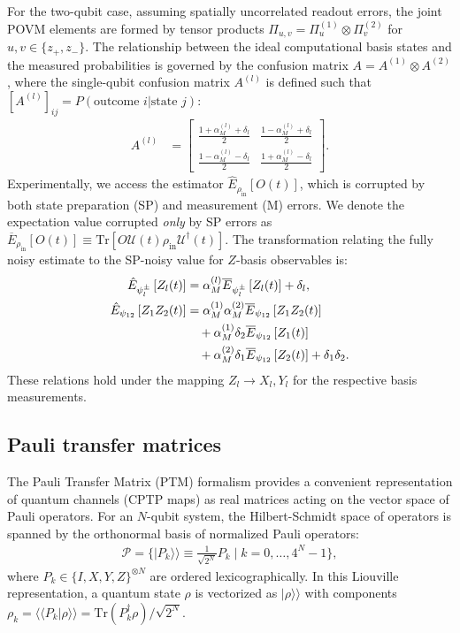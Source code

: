 \documentclass[%
 reprint,
superscriptaddress,
 amsmath,amssymb,
 aps,
pra,
floatfix,
]{revtex4-2}
\begin{document}
For the two-qubit case, assuming spatially uncorrelated readout errors, the joint POVM elements are formed by tensor products $\Pi_{u,v}=\Pi_u^{(1)}\otimes\Pi_v^{(2)}$ for $u,v\in\{z_+,z_-\}$. The relationship between the ideal computational basis states and the measured probabilities is governed by the confusion matrix $A = A^{(1)} \otimes A^{(2)}$, where the single-qubit confusion matrix $A^{(l)}$ is defined such that $[A^{(l)}]_{ij} = P(\text{outcome } i | \text{state } j)$:
\begin{align}
    A^{(l)}&=\begin{bmatrix}
        \frac{1+\alpha_M^{(l)}+\delta_l}{2} & \frac{1-\alpha_M^{(l)}+\delta_l}{2}\\
        \frac{1-\alpha_M^{(l)}-\delta_l}{2} & \frac{1+\alpha_M^{(l)}-\delta_l}{2}
    \end{bmatrix}.
\end{align}
Experimentally, we access the estimator $\hat{E}_{\rho_{\text{in}}}[O(t)]$, which is corrupted by both state preparation (SP) and measurement (M) errors. We denote the expectation value corrupted \textit{only} by SP errors as $\overline{E}_{\rho_{\text{in}}}[O(t)] \equiv \text{Tr}[O \mathcal{U}(t)\rho_{\text{in}}\mathcal{U}^\dagger(t)]$. The transformation relating the fully noisy estimate to the SP-noisy value for $Z$-basis observables is:
\begin{align}
    \hat{E}_{\psi^\pm_l}\left[Z_l(t)\right]&=\alpha^{(l)}_M\overline{E}_{\psi^\pm_l}\left[Z_l(t)\right]+\delta_l,\\
    \hat{E}_{\psi_{12}}\left[Z_1Z_2(t)\right]&=\alpha_M^{(1)}\alpha_M^{(2)}\overline{E}_{\psi_{12}}\left[Z_1Z_2(t)\right]\notag\\
    &\quad+\alpha_M^{(1)}\delta_2\overline{E}_{\psi_{12}}\left[Z_1(t)\right]\notag\\
    &\quad+\alpha_M^{(2)}\delta_1\overline{E}_{\psi_{12}}\left[Z_2(t)\right]+\delta_1\delta_2.
\end{align}
These relations hold under the mapping $Z_l \to X_l, Y_l$ for the respective basis measurements.

\subsection{Pauli transfer matrices} 
The Pauli Transfer Matrix (PTM) formalism provides a convenient representation of quantum channels (CPTP maps) as real matrices acting on the vector space of Pauli operators. For an $N$-qubit system, the Hilbert-Schmidt space of operators is spanned by the orthonormal basis of normalized Pauli operators:
\begin{align}
    \mathcal{P} = \{|P_k\rangle\rangle \equiv \frac{1}{\sqrt{2^N}} P_k \mid k=0,\dots,4^N-1\},
\end{align}
where $P_k \in \{I, X, Y, Z\}^{\otimes N}$ are ordered lexicographically. In this Liouville representation, a quantum state $\rho$ is vectorized as $|\rho\rangle\rangle$ with components $\rho_k = \langle\langle P_k | \rho \rangle\rangle = \text{Tr}(P_k^\dagger \rho)/\sqrt{2^N}$.
\end{document}
